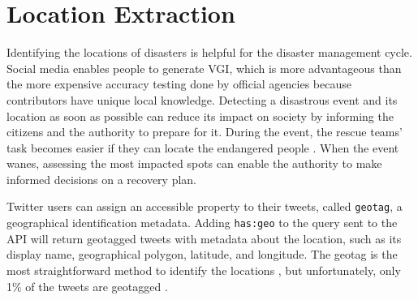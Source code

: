\section{Location Extraction} 
Identifying the locations of disasters is helpful for the disaster
management cycle. Social media enables people to generate \ac{VGI}, which is more advantageous than
the more expensive accuracy testing done by official agencies because contributors have unique local
knowledge.  Detecting a disastrous event and its location as soon as possible can reduce its impact
on society \cite{debruijnGlobalDatabaseHistoric2019b} by informing the citizens and the authority to
prepare for it. During the event, the rescue teams' task becomes easier if they can locate the
endangered people \cite{singhEventClassificationLocation2019}. When the event wanes, assessing the
most impacted spots can enable the authority to make informed decisions on a recovery plan.

Twitter users can assign an accessible property to their tweets, called \texttt{geotag}, a geographical
identification metadata. Adding \texttt{has:geo} to the query sent to the \ac{API} will return geotagged
tweets with metadata about the location, such as its display name, geographical polygon,
latitude, and longitude. The geotag is the most straightforward method to identify the locations 
\cite{fengExtractionPluvialFlood2018}, but unfortunately, only 1\% of the tweets are geotagged
\cite{middletonLocationExtractionSocial2018}.

